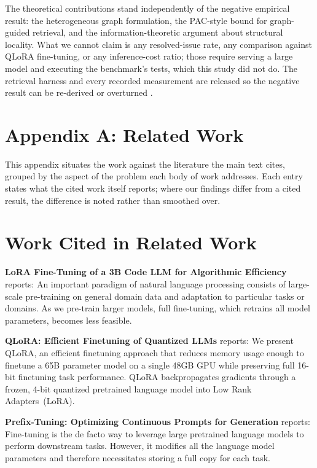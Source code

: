 \documentclass[10pt,journal,compsoc,twocolumn]{IEEEtran}
\begin{document}
The theoretical contributions stand independently of the negative empirical result: the heterogeneous graph formulation, the PAC-style bound for graph-guided retrieval, and the information-theoretic argument about structural locality. What we cannot claim is any resolved-issue rate, any comparison against QLoRA fine-tuning, or any inference-cost ratio; those require serving a large model and executing the benchmark's tests, which this study did not do. The retrieval harness and every recorded measurement are released so the negative result can be re-derived or overturned \cite{arxiv_2406_00584,crossref_10_1201_9788743808145_14}.





\section{Appendix A: Related Work}


This appendix situates the work against the literature the main text cites, grouped by the aspect of the problem each body of work addresses. Each entry states what the cited work itself reports; where our findings differ from a cited result, the difference is noted rather than smoothed over.


\section{Work Cited in Related Work}


\textbf{LoRA Fine-Tuning of a 3B Code LLM for Algorithmic Efficiency} \cite{crossref_10_48550_arxiv_2106_09685} reports: An important paradigm of natural language processing consists of large-scale pre-training on general domain data and adaptation to particular tasks or domains. As we pre-train larger models, full fine-tuning, which retrains all model parameters, becomes less feasible.

\textbf{QLoRA: Efficient Finetuning of Quantized LLMs} \cite{crossref_10_48550_arxiv_2305_14314} reports: We present QLoRA, an efficient finetuning approach that reduces memory usage enough to finetune a 65B parameter model on a single 48GB GPU while preserving full 16-bit finetuning task performance. QLoRA backpropagates gradients through a frozen, 4-bit quantized pretrained language model into Low Rank Adapters~(LoRA).

\textbf{Prefix-Tuning: Optimizing Continuous Prompts for Generation} \cite{arxiv_2101_00190} reports: Fine-tuning is the de facto way to leverage large pretrained language models to perform downstream tasks. However, it modifies all the language model parameters and therefore necessitates storing a full copy for each task.
\end{document}
